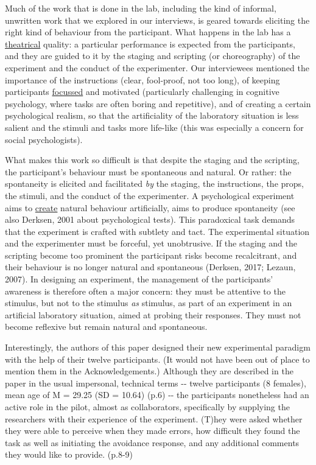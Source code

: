 \documentclass[twocolumn, serif, authordate, review]{jote-article}
\begin{document}
Much of the work that is done in the lab, including the kind of informal, unwritten work that we explored in our interviews, is geared towards eliciting the right kind of behaviour from the participant. What happens in the lab has a \hyperref[sec:reviews]{theatrical}\label{sec:theatrical} quality: a particular performance is expected from the participants, and they are guided to it by the staging and scripting (or choreography) of the experiment and the conduct of the experimenter. Our interviewees mentioned the importance of the instructions (clear, fool-proof, not too long), of keeping participants \hyperref[sec:reviews]{focussed}\label{sec:focussed} and motivated (particularly challenging in cognitive psychology, where tasks are often boring and repetitive), and of creating a certain psychological realism, so that the artificiality of the laboratory situation is less salient and the stimuli and tasks more life-like (this was especially a concern for social psychologists).

What makes this work so difficult is that despite the staging and the scripting, the participant's behaviour must be spontaneous and natural. Or rather: the spontaneity is elicited and facilitated \textit{by} the staging, the instructions, the props, the stimuli, and the conduct of the experimenter. A psychological experiment aims to \hyperref[sec:reviews]{create}\label{sec:create} natural behaviour artificially, aims to produce spontaneity (see also Derksen, 2001 about psychological tests). This paradoxical task demands that the experiment is crafted with subtlety and tact. The experimental situation and the experimenter must be forceful, yet unobtrusive. If the staging and the scripting become too prominent the participant risks become recalcitrant, and their behaviour is no longer natural and spontaneous (Derksen, 2017; Lezaun, 2007). In designing an experiment, the management of the participants' awareness is therefore often a major concern: they must be attentive to the stimulus, but not to the stimulus \textit{as} stimulus, as part of an experiment in an artificial laboratory situation, aimed at probing their responses. They must not become reflexive but remain natural and spontaneous.

Interestingly, the authors of this paper designed their new experimental paradigm with the help of their twelve participants. (It would not have been out of place to mention them in the Acknowledgements.) Although they are described in the paper in the usual impersonal, technical terms -{}- {\textquotedbl}twelve participants (8 females){\textquotedbl}, {\textquotedbl}mean age of M = 29.25 (SD = 10.64){\textquotedbl} (p.6) -{}- the participants nonetheless had an active role in the pilot, almost as collaborators, specifically by supplying the researchers with their experience of the experiment. {\textquotedbl}(T)hey were asked whether they were able to perceive when they made errors, how difficult they found the task as well as initiating the avoidance response, and any additional comments they would like to provide.{\textquotedbl} (p.8-9)
\end{document}
